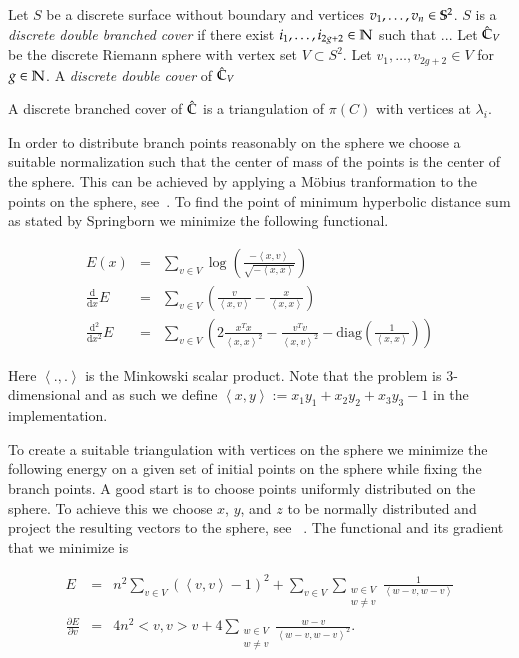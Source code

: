 \documentclass[Thesis.tex]{subfiles}
\begin{document}
\begin{definition}
Let $S$ be a discrete surface without boundary and vertices
$v_1,\ldots,v_n\in\S^2$. $S$ is a \emph{discrete double branched cover} if
there exist $i_1,\ldots, i_{2g+2}\in \N$ such that ...  Let $\Chat_V$ be the discrete Riemann sphere with vertex set
$V\subset S^2$. Let $v_1, \ldots,v_{2g+2} \in V$ for $g\in \N$. A
\emph{discrete double cover} of $\Chat_V$ \end{definition}

A discrete branched cover of $\Chat$ is a triangulation of $\pi(C)$ with
vertices at $\lambda_i$.


In order to distribute branch points reasonably on the sphere we choose
a suitable normalization such that the center of mass of the points is the 
center of the sphere. This can be achieved by applying a M{\"o}bius tranformation
to the points on the sphere, see~\cite{Springborn05}. 
To find the point of minimum hyperbolic distance sum as stated by
Springborn we minimize the following functional. 

\begin{eqnarray*} 
	E(x) &=& \sum_{v\in V}\log\left(\frac{-\left<x,v\right>}{\sqrt{-\left<x,x\right>}}\right)\\
	\frac{\mathrm d}{\mathrm dx}E &=& \sum_{v\in V}\left(\frac{v}{\left<x,v\right>} - \frac{x}{\left<x,x\right>}\right)\\
	\frac{\mathrm d^2}{\mathrm dx^2}E &=& \sum_{v\in V}\left(2\frac{x^Tx}{\left<x,x\right>^2}-\frac{v^Tv}{\left<x,v\right>^2} - \mathrm{diag}\left(\frac{1}{\left<x,x\right>}\right)\right)
\end{eqnarray*}

Here $\left<.,.\right>$ is the Minkowski scalar product. Note that the problem is
 $3$-dimensional and as such we define $\left<x,y\right>:=x_1y_1+x_2y_2+x_3y_3-1$ in
the implementation.


To create a suitable triangulation with vertices on the sphere we minimize the following energy on a given set of initial points on the sphere while fixing the branch points. 
A good start is to choose points uniformly distributed on the sphere. 
To achieve this we choose $x$, $y$, and $z$ to be normally distributed and project the resulting vectors to the sphere, see~ \cite{Muller1959}. 
The functional and its gradient that we minimize is

\begin{eqnarray*}
	E &=& n^2\sum_{v\in V}\left( \left<v,v\right> - 1\right)^2 + \sum_{v\in
V}\sum_{\substack{w\in V\\w\neq v}} \frac{1}{\left<w-v, w-v\right>}\\ \frac{\partial
E}{\partial v} &=& 4n^2<v,v>v + 4\sum_{\substack{w\in V\\w\neq
v}}\frac{w-v}{\left<w-v,w-v\right>^2}.  \end{eqnarray*}
\end{document}
